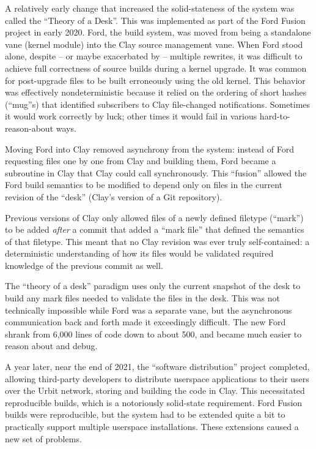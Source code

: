 \documentclass[twoside]{article}
\begin{document}
A relatively early change that increased the solid-stateness of the system was called the ``Theory of a Desk''.  This was implemented as part of the Ford Fusion project in early 2020.  Ford, the build system, was moved from being a standalone vane (kernel module) into the Clay source management vane.  When Ford stood alone, despite – or maybe exacerbated by – multiple rewrites, it was difficult to achieve full correctness of source builds during a kernel upgrade.  It was common for post-upgrade files to be built erroneously using the old kernel.  This behavior was effectively nondeterministic because it relied on the ordering of short hashes (``mug''s) that identified subscribers to Clay file-changed notifications.  Sometimes it would work correctly by luck; other times it would fail in various hard-to-reason-about ways.

Moving Ford into Clay removed asynchrony from the system:  instead of Ford requesting files one by one from Clay and building them, Ford became a subroutine in Clay that Clay could call synchronously.  This ``fusion'' allowed the Ford build semantics to be modified to depend only on files in the current revision of the ``desk'' (Clay's version of a Git repository).

Previous versions of Clay only allowed files of a newly defined filetype (``mark'') to be added \emph{after} a commit that added a ``mark file'' that defined the semantics of that filetype.  This meant that no Clay revision was ever truly self-contained: a deterministic understanding of how its files would be validated required knowledge of the previous commit as well.

The ``theory of a desk'' paradigm uses only the current snapshot of the desk to build any mark files needed to validate the files in the desk.  This was not technically impossible while Ford was a separate vane, but the asynchronous communication back and forth made it exceedingly difficult.  The new Ford shrank from 6,000 lines of code down to about 500, and became much easier to reason about and debug.

A year later, near the end of 2021, the ``software distribution'' project completed, allowing third-party developers to distribute userspace applications to their users over the Urbit network, storing and building the code in Clay.  This necessitated reproducible builds, which is a notoriously solid-state requirement.  Ford Fusion builds were reproducible, but the system had to be extended quite a bit to practically support multiple userspace installations.  These extensions caused a new set of problems.
\end{document}
